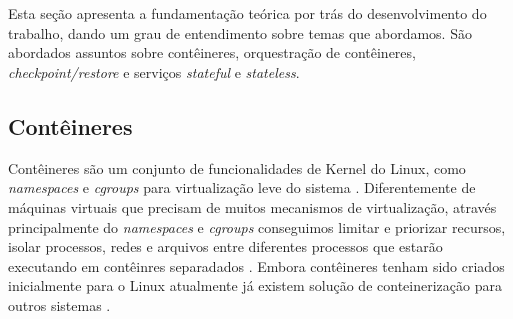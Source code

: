 

\chapter{} \label{cap:fundamentacao:teorica}

Esta seção apresenta a fundamentação teórica por trás do desenvolvimento
do trabalho, dando um grau de entendimento sobre temas que abordamos. São
abordados assuntos sobre contêineres, orquestração de contêineres,
\textit{checkpoint/restore} e serviços \textit{stateful} e \textit{stateless}.

\section{Contêineres}

Contêineres são um conjunto de funcionalidades de Kernel do Linux, como
\textit{namespaces} e \textit{cgroups} \cite{laadan2010linux} para virtualização
leve do sistema \cite{Chen2015/10} \cite{kubernetes}. Diferentemente de máquinas
virtuais que precisam de muitos mecanismos de virtualização, através principalmente
do \textit{namespaces} e \textit{cgroups} conseguimos limitar e priorizar recursos,
isolar processos, redes e arquivos entre diferentes processos que estarão executando
em contêinres separadados \cite{kubernetes}. Embora contêineres tenham sido criados
inicialmente para o Linux atualmente já existem solução de conteinerização para
outros sistemas \cite{laadan2010linux}.


